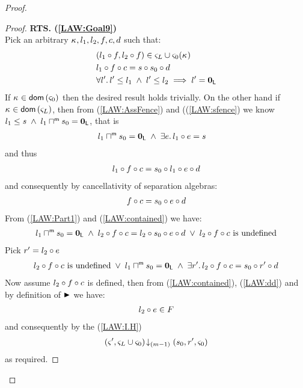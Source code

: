 \begin{lemma}[]
\begin{proof}
\begin{proof}
\noindent\textbf{RTS. (\ref{LAW:Goal9})}\\
Pick an arbitrary $\kappa_{}, l_1, l_2, f, c, d$ such that:
%
\begin{align}
	& (l_1 \circ f, l_2 \circ f) \in \varsigma_{L} \cup \varsigma_{0}(\kappa_{}) \label{LAW:Ass16}\\
	& l_1 \circ f \circ c = s \circ s_0 \circ d \label{LAW:Ass17}\\
	& \forall l'.\, l' \leq l_1 \;\land\; l' \leq l_2 \implies l' = \mathbf{0}_{\textsf{L}}
\end{align}
%
If $\kappa_{} \in \textsf{dom}\left( \varsigma_{0} \right)$ then the desired result holds trivially. On the other hand if $\kappa_{} \in \textsf{dom}\left( \varsigma_{L} \right)$, then from (\ref{LAW:AssFence}) and ((\ref{LAW:sfence}) we know $l_1 \leq s \;\land\; l_1 \sqcap_{}^{\textsf{m}} s_0 = \mathbf{0}_{\textsf{L}}$, that is 
%
\begin{align}
	& l_1 \sqcap_{}^{\textsf{m}} s_0 = \mathbf{0}_{\textsf{L}} \;\land\; \exists e.\, l_1 \circ e = s \label{LAW:contained}
\end{align}
%
and thus
%
\begin{align}
	l_1 \circ f \circ c = s_0 \circ l_1 \circ e \circ d \nonumber
\end{align}
%
and consequently by cancellativity of separation algebras:
%
\begin{align}
	f \circ c = s_0 \circ e \circ d \label{LAW:Part1}
\end{align}
%
From (\ref{LAW:Part1}) and (\ref{LAW:contained}) we have:
%
\begin{align}
	l_1 \sqcap_{}^{\textsf{m}} s_0 = \mathbf{0}_{\textsf{L}} \;\land\;  l_2 \circ f \circ c = l_2 \circ s_0 \circ e \circ d \;\lor\; l_2 \circ f \circ c \text{ is undefined} \nonumber
\end{align}
%
Pick $r' = l_2 \circ e$
%
\begin{align}
	l_2 \circ f \circ c \text{ is undefined} \;\lor\; l_1 \sqcap_{}^{\textsf{m}} s_0 = \mathbf{0}_{\textsf{L}} \;\land\; \exists r'.\, l_2 \circ f \circ c = s_0 \circ r' \circ d \label{LAW:Part2}
\end{align}
%
Now assume $l_2 \circ f \circ c$ is defined, then from (\ref{LAW:contained}), (\ref{LAW:dd}) and by definition of $\strictfences$ we have:
%
\begin{align}
	l_2 \circ e \in F \label{LAW:fenced}
\end{align}
%
and consequently by the (\ref{LAW:I.H})
%
\begin{align}
	\left(\varsigma_{}', \varsigma_{L} \cup \varsigma_{0}\right) \!\downarrow_{(m-1)} \left(s_0, r', \varsigma_{0}\right)
\end{align}
as required.
\renewcommand{\qed}{}
\end{proof}


\end{proof}
\end{lemma}
